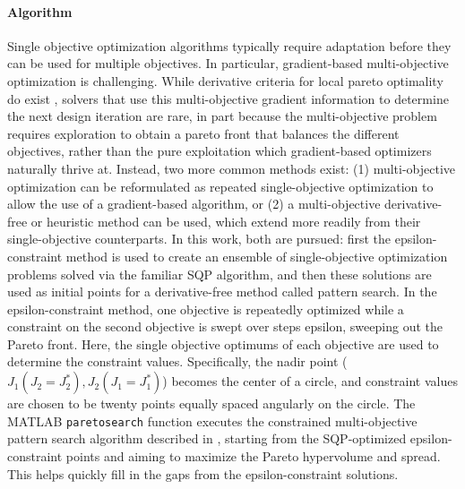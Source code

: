 \paragraph{Algorithm}
Single objective optimization algorithms typically require adaptation before they can be used for multiple objectives.
In particular, gradient-based multi-objective optimization is challenging.
While derivative criteria for local pareto optimality do exist \cite{desideri_multiple-gradient_2012}, solvers that use this multi-objective gradient information to determine the next design iteration are rare, in part because the multi-objective problem requires exploration to obtain a pareto front that balances the different objectives, rather than the pure exploitation which gradient-based optimizers naturally thrive at.
Instead, two more common methods exist: (1) multi-objective optimization can be reformulated as repeated single-objective optimization to allow the use of a gradient-based algorithm, or (2) a multi-objective derivative-free or heuristic method can be used, which extend more readily from their single-objective counterparts.
In this work, both are pursued: first the epsilon-constraint method is used to create an ensemble of single-objective optimization problems solved via the familiar SQP algorithm, and then these solutions are used as initial points for a derivative-free method called pattern search.
In the epsilon-constraint method, one objective is repeatedly optimized while a constraint on the second objective is swept over steps epsilon, sweeping out the Pareto front.
Here, the single objective optimums of each objective are used to determine the constraint values.
Specifically, the nadir point ($J_1(J_2=J_2^*), J_2(J_1=J_1^*)$) becomes the center of a circle, and constraint values are chosen to be twenty points equally spaced angularly on the circle.
The MATLAB  \texttt{paretosearch} function executes the constrained multi-objective pattern search algorithm described in \cite{custodio_direct_2011}, starting from the SQP-optimized epsilon-constraint points and aiming to maximize the Pareto hypervolume and spread.
This helps quickly fill in the gaps from the epsilon-constraint solutions.



